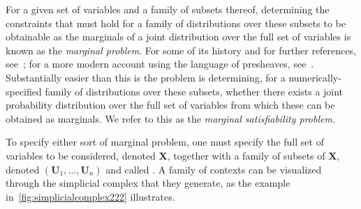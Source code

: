 \documentclass[aps,english,superscriptaddress,onecolumn,twoside,longbibliography,pra,floatfix,fleqn,nofootinbib]{revtex4-1}%
\newcommand*{\tblue}[1]{{\color{MidnightBlue}{\textbf{#1}}}}
\theoremstyle{definition}
\begin{document}
For a given set of variables and a family of subsets thereof, determining the constraints that must hold for a family of distributions over these subsets to be obtainable as the marginals of a joint distribution over the full set of variables is known as the {\em marginal problem}.
For some of its history and for further references, see~\cite{fritz2013marginal}; for a more modern account using the language of presheaves, see~\cite{abramsky_contextuality_2011}.
Substantially easier than this is the problem is determining, for a numerically-specified family of distributions over these subsets, whether there exists a joint probability distribution over the full set of variables from which these can be obtained as marginals.  We refer to this as the {\em marginal satisfiability problem}.



To specify either sort of marginal problem, 
one must specify the full set of variables to be considered, denoted $\bm{X}$, together with a family of subsets of $\bm{X}$, denoted $(\bm{U}_1,\ldots,\bm{U}_n)$ and called \tblue{contexts}.
A family of contexts can be visualized through 
the simplicial complex that they generate, as the example in~\cref{fig:simplicialcomplex222} illustrates. 
\end{document}
